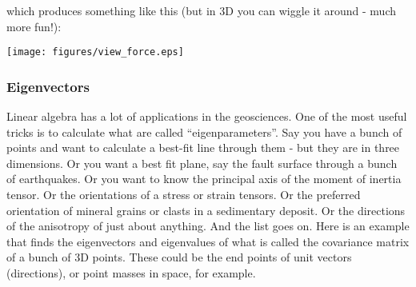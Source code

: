 which produces something like this (but in 3D you can wiggle it around - much more fun!):

\texttt{[image: figures/view\_force.eps]}

%



%



%




\subsubsection{Eigenvectors}

Linear algebra has a lot of applications in the geosciences.  One of the most useful tricks is to calculate what are called ``eigenparameters''.  Say you have a bunch of points and want to calculate a best-fit line through them - but they are in three dimensions.  Or you want a best fit plane, say the fault surface through a bunch of earthquakes.  Or you want to know the principal axis of the  moment of inertia tensor.  Or the orientations of a stress or strain tensors.  Or the preferred orientation of mineral grains or clasts in a sedimentary deposit.  Or the directions of the  anisotropy of just about anything.
And the list goes on.  Here is an example that finds the eigenvectors and eigenvalues of what is called the covariance matrix of a bunch of 3D points. These could be the end points of unit vectors (directions), or point masses in space, for example.



